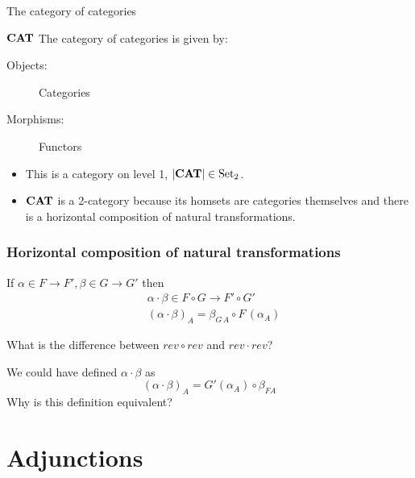 \documentclass[handout]{beamer}
\begin{document}
\begin{frame}{The category of categories}

  \begin{block}{$\mathbf{CAT}$}
    The category of categories is given by:
    \begin{description}
    \item[Objects:] Categories

    \item[Morphisms:] Functors
    \end{description}
  \end{block}

  \begin{itemize}
  \item This is a category on level 1, $|\mathbf{CAT}| \in \mathrm{Set}_2$.

  \item $\mathbf{CAT}$ is a 2-category because its homsets are categories themselves
    and there is a horizontal composition of natural transformations.
  \end{itemize}
  
\end{frame}

\begin{frame}
  \frametitle{Horizontal composition of natural transformations}
      
  If $\alpha \in F \to F', \beta \in G \to G'$ then
  \begin{align*}
    & \alpha \cdot \beta \in  F \circ G \to F' \circ G'\\
    & (\alpha \cdot \beta)_A = \beta_{G\,A} \circ F\,(\alpha_A)
  \end{align*}

  \begin{question}
    What is the difference between $rev \circ rev$ and $rev \cdot rev$?
  \end{question}

  \begin{question}
    We could have defined $\alpha \cdot \beta$ as
    \[ (\alpha \cdot \beta)_A = G' (\alpha_A) \circ \beta_{F A} \]
    Why is this definition equivalent?
  \end{question}
\end{frame}



\section{Adjunctions}
\end{document}
